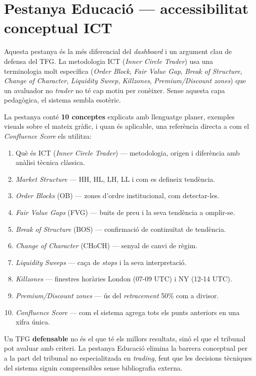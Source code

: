 \documentclass[12pt, a4paper]{report}
\begin{document}
\section{Pestanya Educació --- accessibilitat conceptual ICT}
\label{sec:tabeducacio}

Aquesta pestanya és la més diferencial del \textit{dashboard} i un argument clau de defensa del TFG. La metodologia ICT (\textit{Inner Circle Trader}) usa una terminologia molt específica (\textit{Order Block}, \textit{Fair Value Gap}, \textit{Break of Structure}, \textit{Change of Character}, \textit{Liquidity Sweep}, \textit{Killzones}, \textit{Premium/Discount zones}) que un avaluador no \textit{trader} no té cap motiu per conèixer. Sense aquesta capa pedagògica, el sistema sembla esotèric.

La pestanya conté \textbf{10 conceptes} explicats amb llenguatge planer, exemples visuals sobre el mateix gràfic, i quan és aplicable, una referència directa a com el \textit{Confluence Score} els utilitza:

\begin{enumerate}
  \item Què és ICT (\textit{Inner Circle Trader}) --- metodologia, origen i diferència amb anàlisi tècnica clàssica.
  \item \textit{Market Structure} --- HH, HL, LH, LL i com es defineix tendència.
  \item \textit{Order Blocks} (OB) --- zones d'ordre institucional, com detectar-les.
  \item \textit{Fair Value Gaps} (FVG) --- buits de preu i la seva tendència a omplir-se.
  \item \textit{Break of Structure} (BOS) --- confirmació de continuïtat de tendència.
  \item \textit{Change of Character} (CHoCH) --- senyal de canvi de règim.
  \item \textit{Liquidity Sweeps} --- caça de \textit{stops} i la seva interpretació.
  \item \textit{Killzones} --- finestres horàries London (07-09 UTC) i NY (12-14 UTC).
  \item \textit{Premium/Discount zones} --- ús del \textit{retracement} 50\% com a divisor.
  \item \textit{Confluence Score} --- com el sistema agrega tots els punts anteriors en una xifra única.
\end{enumerate}

\begin{infobox}
Un TFG \textbf{defensable} no és el que té els millors resultats, sinó el que el tribunal pot avaluar amb criteri. La pestanya Educació elimina la barrera conceptual per a la part del tribunal no especialitzada en \textit{trading}, fent que les decisions tècniques del sistema siguin comprensibles sense bibliografia externa.
\end{infobox}
\end{document}
